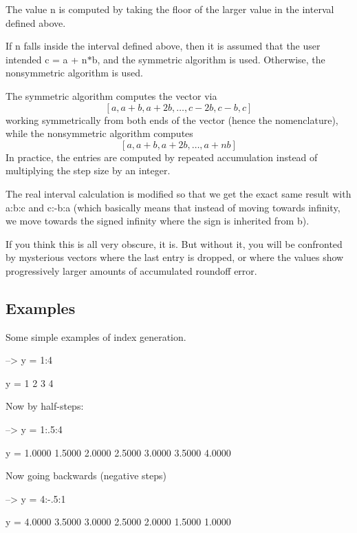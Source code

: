 \begin{DoxyEnumerate}
\item The value {\ttfamily n} is computed by taking the floor of the larger value in the interval defined above.  
\item If {\ttfamily n} falls inside the interval defined above, then it is assumed that the user intended {\ttfamily c = a + n$\ast$b}, and the symmetric algorithm is used. Otherwise, the nonsymmetric algorithm is used.  
\item The symmetric algorithm computes the vector via \[ [a, a+b, a+2b,\ldots,c-2b,c-b,c] \] working symmetrically from both ends of the vector (hence the nomenclature), while the nonsymmetric algorithm computes \[ [a, a+b ,a+2b,\ldots,a+nb] \] In practice, the entries are computed by repeated accumulation instead of multiplying the step size by an integer.  
\item The real interval calculation is modified so that we get the exact same result with {\ttfamily a\-:b\-:c} and {\ttfamily c\-:-\/b\-:a} (which basically means that instead of moving towards infinity, we move towards the signed infinity where the sign is inherited from {\ttfamily b}).  
\end{DoxyEnumerate}If you think this is all very obscure, it is. But without it, you will be confronted by mysterious vectors where the last entry is dropped, or where the values show progressively larger amounts of accumulated roundoff error. \hypertarget{variables_matrix_Examples}{}\subsection{Examples}\label{variables_matrix_Examples}
Some simple examples of index generation.


\begin{DoxyVerbInclude}
--> y = 1:4

y = 
 1 2 3 4 
\end{DoxyVerbInclude}


Now by half-\/steps\-:


\begin{DoxyVerbInclude}
--> y = 1:.5:4

y = 
    1.0000    1.5000    2.0000    2.5000    3.0000    3.5000    4.0000 
\end{DoxyVerbInclude}


Now going backwards (negative steps)


\begin{DoxyVerbInclude}
--> y = 4:-.5:1

y = 
    4.0000    3.5000    3.0000    2.5000    2.0000    1.5000    1.0000 
\end{DoxyVerbInclude}


